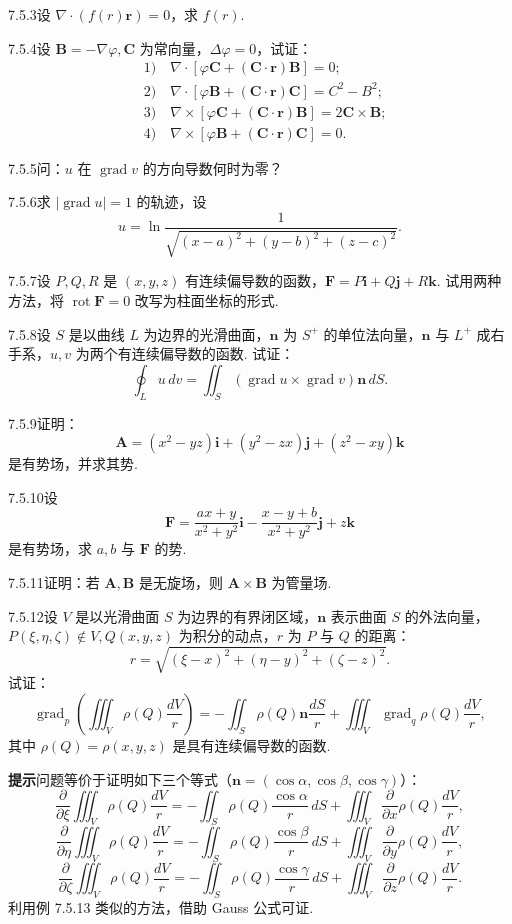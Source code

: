 \documentclass[UTF8, 12pt, fontset=fandol, oneside]{ctexart}
\begin{document}
7.5.3\quad 设 $\nabla\cdot(f(r)\mathbf r)=0$，求 $f(r)$.

7.5.4\quad 设 $\mathbf B=-\nabla\varphi,\mathbf C$ 为常向量，$\Delta\varphi=0$，试证：
\[
\begin{aligned}
&1)\quad \nabla\cdot[\varphi\mathbf C+(\mathbf C\cdot\mathbf r)\mathbf B]=0;\\
&2)\quad \nabla\cdot[\varphi\mathbf B+(\mathbf C\cdot\mathbf r)\mathbf C]=C^2-B^2;\\
&3)\quad \nabla\times[\varphi\mathbf C+(\mathbf C\cdot\mathbf r)\mathbf B]=2\mathbf C\times\mathbf B;\\
&4)\quad \nabla\times[\varphi\mathbf B+(\mathbf C\cdot\mathbf r)\mathbf C]=0.
\end{aligned}
\]

7.5.5\quad 问：$u$ 在 $\operatorname{grad}v$ 的方向导数何时为零？

7.5.6\quad 求 $|\operatorname{grad}u|=1$ 的轨迹，设
\[
u=\ln\frac1{\sqrt{(x-a)^2+(y-b)^2+(z-c)^2}}.
\]

7.5.7\quad 设 $P,Q,R$ 是 $(x,y,z)$ 有连续偏导数的函数，$\mathbf F=P\mathbf i+Q\mathbf j+R\mathbf k$. 试用两种方法，将 $\operatorname{rot}\mathbf F=0$ 改写为柱面坐标的形式.

7.5.8\quad 设 $S$ 是以曲线 $L$ 为边界的光滑曲面，$\mathbf n$ 为 $S^+$ 的单位法向量，$\mathbf n$ 与 $L^+$ 成右手系，$u,v$ 为两个有连续偏导数的函数. 试证：
\[
\oint_Lu\,dv=\iint_S(\operatorname{grad}u\times\operatorname{grad}v)\mathbf n\,dS.
\]

7.5.9\quad 证明：
\[
\mathbf A=(x^2-yz)\mathbf i+(y^2-zx)\mathbf j+(z^2-xy)\mathbf k
\]
是有势场，并求其势.

7.5.10\quad 设
\[
\mathbf F=\frac{ax+y}{x^2+y^2}\mathbf i-\frac{x-y+b}{x^2+y^2}\mathbf j+z\mathbf k
\]
是有势场，求 $a,b$ 与 $\mathbf F$ 的势.

7.5.11\quad 证明：若 $\mathbf A,\mathbf B$ 是无旋场，则 $\mathbf A\times\mathbf B$ 为管量场.

7.5.12\quad 设 $V$ 是以光滑曲面 $S$ 为边界的有界闭区域，$\mathbf n$ 表示曲面 $S$ 的外法向量，$P(\xi,\eta,\zeta)\notin V,Q(x,y,z)$ 为积分的动点，$r$ 为 $P$ 与 $Q$ 的距离：
\[
r=\sqrt{(\xi-x)^2+(\eta-y)^2+(\zeta-z)^2}.
\]
试证：
\[
\operatorname{grad}_p\left(\iiint_V\rho(Q)\frac{dV}{r}\right)
=-\iint_S\rho(Q)\mathbf n\frac{dS}{r}
+\iiint_V\operatorname{grad}_q\rho(Q)\frac{dV}{r},
\]
其中 $\rho(Q)=\rho(x,y,z)$ 是具有连续偏导数的函数.

\noindent\textbf{提示}\quad 问题等价于证明如下三个等式（$\mathbf n=(\cos\alpha,\cos\beta,\cos\gamma)$）：
\[
\frac{\partial}{\partial\xi}\iiint_V\rho(Q)\frac{dV}{r}
=-\iint_S\rho(Q)\frac{\cos\alpha}{r}\,dS+\iiint_V\frac{\partial}{\partial x}\rho(Q)\frac{dV}{r},
\]
\[
\frac{\partial}{\partial\eta}\iiint_V\rho(Q)\frac{dV}{r}
=-\iint_S\rho(Q)\frac{\cos\beta}{r}\,dS+\iiint_V\frac{\partial}{\partial y}\rho(Q)\frac{dV}{r},
\]
\[
\frac{\partial}{\partial\zeta}\iiint_V\rho(Q)\frac{dV}{r}
=-\iint_S\rho(Q)\frac{\cos\gamma}{r}\,dS+\iiint_V\frac{\partial}{\partial z}\rho(Q)\frac{dV}{r}.
\]
利用例 7.5.13 类似的方法，借助 Gauss 公式可证.
\end{document}
